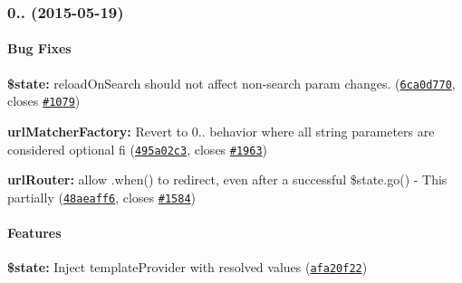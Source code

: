 {\bfseries {\bfseries {\bfseries \label{_0.2.15}%
 \subsubsection*{0.. (2015-\/05-\/19)}}}}

{\bfseries {\bfseries {\bfseries }}}

{\bfseries {\bfseries {\bfseries \paragraph*{Bug Fixes}}}}

{\bfseries {\bfseries {\bfseries }}}

{\bfseries {\bfseries {\bfseries 
\begin{DoxyItemize}
\item {\bfseries \$state\+:} reload\+On\+Search should not affect non-\/search param changes. (\href{https://github.com/angular-ui/ui-router/commit/6ca0d7704cf7de9c6e6b7bb64df2f9c68fe081cc}{\tt 6ca0d770}, closes \href{https://github.com/angular-ui/ui-router/issues/1079}{\tt \#1079})
\item {\bfseries url\+Matcher\+Factory\+:} Revert to 0.. behavior where all string parameters are considered optional fi (\href{https://github.com/angular-ui/ui-router/commit/495a02c3cbde501c1c149bce137806669209bc29}{\tt 495a02c3}, closes \href{https://github.com/angular-ui/ui-router/issues/1963}{\tt \#1963})
\item {\bfseries url\+Router\+:} allow .when() to redirect, even after a successful \$state.\+go() -\/ This partially (\href{https://github.com/angular-ui/ui-router/commit/48aeaff645baf3f42f5a8940ebd97563791ad9f8}{\tt 48aeaff6}, closes \href{https://github.com/angular-ui/ui-router/issues/1584}{\tt \#1584})
\end{DoxyItemize}}}}

{\bfseries {\bfseries {\bfseries \paragraph*{Features}}}}

{\bfseries {\bfseries {\bfseries }}}

{\bfseries {\bfseries {\bfseries 
\begin{DoxyItemize}
\item {\bfseries \$state\+:} Inject template\+Provider with resolved values (\href{https://github.com/angular-ui/ui-router/commit/afa20f22373b7176b26daa7e1099750c4254a354}{\tt afa20f22})
\end{DoxyItemize}}}}

